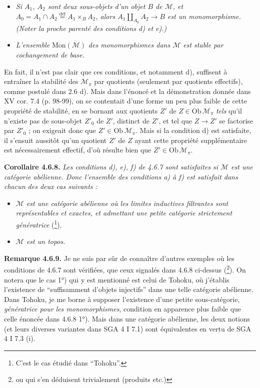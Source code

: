 \documentclass[11pt]{article}
\newcommand{\printedpage}[1]{\marginpar{\footnotesize p.~#1}}
\newcommand{\msp}[1]{\marginpar{\footnotesize [#1]}}
\newcommand{\Mc}{\mathcal{M}}
\begin{document}
\begin{itemize}[leftmargin=4em]
\item[\textit{e)}] \textit{Si $A_1$, $A_2$ sont deux sous-objets d'un objet $B$ de $\Mc$, et $A_0 = A_1 \cap A_2 \overset{\text{déf}}{=} A_1 \times_B A_2$, alors $A_1 \amalg_{A_0} A_2 \longrightarrow B$ est un monomorphisme. (Noter la proche parenté des conditions d) et e).)}
\item[\textit{f)}] \textit{L'ensemble} $\mathrm{Mon}(\Mc)$ \textit{des monomorphismes dans $\Mc$ est stable par cochangement de base.}
\end{itemize}
En fait, il n'est pas clair que ces conditions, et notamment d), suffisent à entraîner la stabilité des $\Mc_{\pi}$ par quotients (seulement par quotients effectifs), comme postulé dans 2.6 d). Mais dans l'énoncé et la démonstration donnée dans XV cor. 7.4 (p. 98-99), on se contentait d'une forme un peu plus faible de cette propriété de stabilité, en se bornant aux quotients $Z'$ de $Z \in \mathrm{Ob}\,\Mc_{\pi}$ \textit{tels} qu'il n'existe pas de sous-objet $Z'_0$ de $Z'$, distinct de $Z'$, et tel que $Z \longrightarrow Z'$ se factorise par $Z'_0$ ; on exigeait donc que $Z' \in \mathrm{Ob}\,\Mc_{\pi}$. Mais si la condition d) est satisfaite, il s'ensuit aussitôt qu'un quotient $Z'$ de $Z$ ayant cette propriété supplémentaire est nécessairement effectif, d'où résulte bien que $Z' \in \mathrm{Ob}\,\Mc_{\pi}$.

\printedpage{52}
\msp{page 159}

\textbf{Corollaire 4.6.8.} \textit{Les conditions d), e), f) de 4.6.7 sont satisfaites si $\Mc$ est une catégorie abélienne. Donc l'ensemble des conditions a) à f) est satisfait dans chacun des deux cas suivants :}
\begin{itemize}[leftmargin=4em]
\item[\textit{1)}] \textit{$\Mc$ est une catégorie abélienne où les limites inductives filtrantes sont représentables et exactes, et admettant une petite catégorie strictement génératrice} (\footnote[63]{C'est le cas étudié dans “Tohoku”.}).
\item[\textit{2)}] \textit{$\Mc$ est un topos.}
\end{itemize}
\textbf{Remarque 4.6.9.} Je ne suis par sûr de connaître d'autres exemples où les conditions de 4.6.7 sont vérifiées, que ceux signalés dans 4.6.8 ci-dessus (\footnote[64]{ou qui s'en déduisent trivialement (produits etc.)}). On notera que le cas 1°) qui y est mentionné est celui de Tohoku, où j'établis l'existence de “suffisamment d'objets injectifs” dans une telle catégorie abélienne. Dans Tohoku, je me borne à supposer l'existence d'une petite sous-catégorie, \textit{génératrice pour les monomorphismes}, condition en apparence plus faible que celle énoncée dans 4.6.8 1°). Mais dans une catégorie abélienne, les deux notions (et leurs diverses variantes dans SGA 4 I 7.1) sont équivalentes en vertu de SGA 4 I 7.3 (i). %
\end{document}
